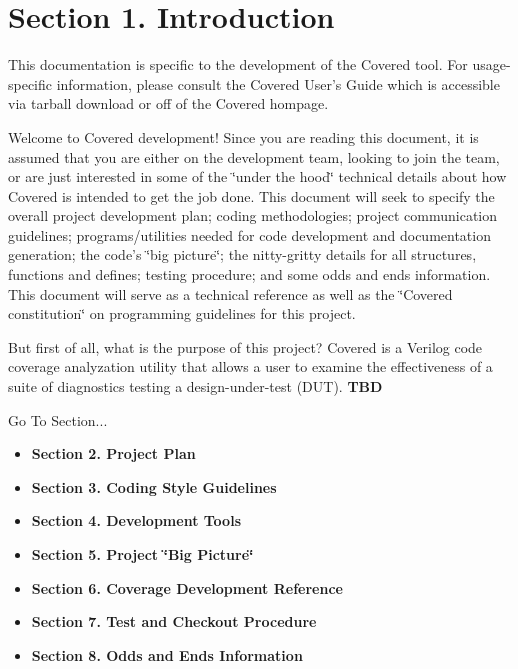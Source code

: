 \section{Section 1.  Introduction}\label{page_intro}
\begin{Desc}
\item[]This documentation is specific to the development of the Covered tool. For usage-specific information, please consult the Covered User's Guide which is accessible via tarball download or off of the Covered hompage.\end{Desc}
\begin{Desc}
\item[]Welcome to Covered development! Since you are reading this document, it is assumed that you are either on the development team, looking to join the team, or are just interested in some of the \char`\"{}under the hood\char`\"{} technical details about how Covered is intended to get the job done. This document will seek to specify the overall project development plan; coding methodologies; project communication guidelines; programs/utilities needed for code development and documentation generation; the code's \char`\"{}big picture\char`\"{}; the nitty-gritty details for all structures, functions and defines; testing procedure; and some odds and ends information. This document will serve as a technical reference as well as the \char`\"{}Covered constitution\char`\"{} on programming guidelines for this project.\end{Desc}
\begin{Desc}
\item[]But first of all, what is the purpose of this project? Covered is a Verilog code coverage analyzation utility that allows a user to examine the effectiveness of a suite of diagnostics testing a design-under-test (DUT). {\bf TBD}  \end{Desc}




\begin{Desc}
\item[Go To Section...]\begin{itemize}
\item {\bf Section 2.  Project Plan} \item {\bf Section 3.  Coding Style Guidelines} \item {\bf Section 4.  Development Tools} \item {\bf Section 5.  Project \char`\"{}Big Picture\char`\"{}} \item {\bf Section 6.  Coverage Development Reference} \item {\bf Section 7.  Test and Checkout Procedure} \item {\bf Section 8.  Odds and Ends Information} \end{itemize}
\end{Desc}
